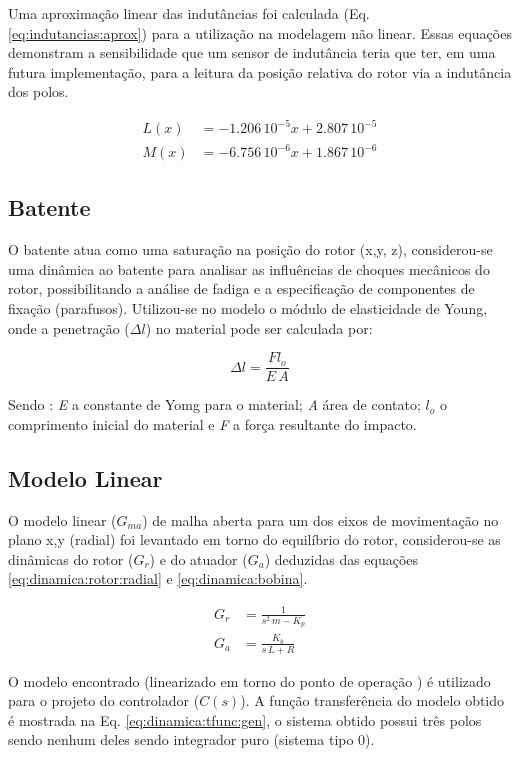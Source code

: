 Uma aproximação linear das indutâncias foi calculada (Eq. \ref{eq:indutancias:aprox}) para a utilização na modelagem não linear. Essas equações demonstram a sensibilidade que um sensor de indutância teria que ter, em uma futura implementação, para a leitura da posição relativa do rotor via a indutância dos polos.

\begin{align}
	L(x) &= -1.206 \,10^{-5} x + 2.807 \, 10^{-5} \\
	M(x) &= -6.756 \,10^{-6} x + 1.867 \, 10^{-6} 
	\label{eq:indutancias:aprox}
\end{align} 

\subsection{Batente}

O batente atua como uma saturação na posição do rotor (x,y, z), considerou-se uma dinâmica ao batente para analisar as influências de choques mecânicos do rotor, possibilitando a análise de fadiga e a especificação de componentes de fixação (parafusos). Utilizou-se no  modelo o módulo de elasticidade de Young, onde a penetração ($\Delta l $) no material pode ser calculada por:

\begin{equation}
	\Delta l =  \frac{F l_o}{E \, A}
\end{equation}

Sendo : \textit{E} a constante de Yomg para o material; \textit{A} área de contato; \textbf{$l_o$ } o comprimento inicial do material e \textit{F} a força resultante do impacto. 


\subsection{Modelo Linear}

O modelo linear ($G_{ma}$) de malha aberta para um dos eixos de movimentação no plano x,y (radial) foi levantado em torno do equilíbrio do rotor, considerou-se as dinâmicas do rotor ($G_r$) e do atuador ($G_a$) deduzidas das equações  \eqref{eq:dinamica:rotor:radial} e \eqref{eq:dinamica:bobina}.

\begin{align}
	G_r &= \frac{1}{s^2 \, m - K_p} \\
	G_a &= \frac{K_b}{s\, L + R}
\end{align}

O modelo encontrado (linearizado em torno do ponto de operação ) é utilizado para o projeto do controlador ($C(s)$). A função transferência do modelo obtido é mostrada na Eq. \eqref{eq:dinamica:tfunc:gen}, o sistema obtido possui três polos sendo nenhum deles sendo integrador puro (sistema tipo 0).   

